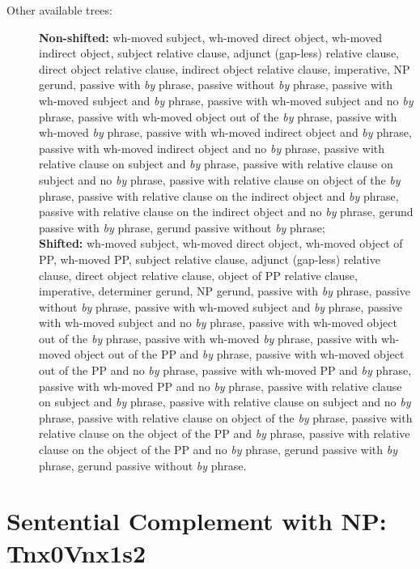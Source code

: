 \begin{description}
\item[Other available trees:] {\bf Non-shifted:} wh-moved subject, wh-moved
direct object, wh-moved indirect object, subject relative clause, adjunct (gap-less) relative clause, direct
object relative clause, indirect object relative clause, imperative, NP
gerund, passive with {\it by} phrase, passive without {\it by} phrase,
passive with wh-moved subject and {\it by} phrase, passive with wh-moved
subject and no {\it by} phrase, passive with wh-moved object out of the
{\it by} phrase, passive with wh-moved {\it by} phrase, passive with
wh-moved indirect object and {\it by} phrase, passive with wh-moved
indirect object and no {\it by} phrase, passive with relative clause on
subject and {\it by} phrase, passive with relative clause on subject and no
{\it by} phrase, passive with relative clause on object of the {\it by}
phrase, passive with relative clause on the indirect object and {\it by}
phrase, passive with relative clause on the indirect object and no {\it by}
phrase, gerund passive with {\it by} phrase, gerund passive without {\it
by} phrase;\\ 
{\bf Shifted:} wh-moved subject, wh-moved direct object,
wh-moved object of PP, wh-moved PP, subject relative clause, adjunct (gap-less) relative clause, direct object
relative clause, object of PP relative clause, imperative, determiner
gerund, NP gerund, passive with {\it by} phrase, passive without {\it by}
phrase, passive with wh-moved subject and {\it by} phrase, passive with
wh-moved subject and no {\it by} phrase, passive with wh-moved object out
of the {\it by} phrase, passive with wh-moved {\it by} phrase, passive with
wh-moved object out of the PP and {\it by} phrase, passive with wh-moved
object out of the PP and no {\it by} phrase, passive with wh-moved PP and
{\it by} phrase, passive with wh-moved PP and no {\it by} phrase, passive
with relative clause on subject and {\it by} phrase, passive with relative
clause on subject and no {\it by} phrase, passive with relative clause on
object of the {\it by} phrase, passive with relative clause on the object
of the PP and {\it by} phrase, passive with relative clause on the object
of the PP and no {\it by} phrase, gerund passive with {\it by} phrase,
gerund passive without {\it by} phrase.


\end{description}




\section{Sentential Complement with NP: Tnx0Vnx1s2} 
\label{nx0Vnx1s2-family}

